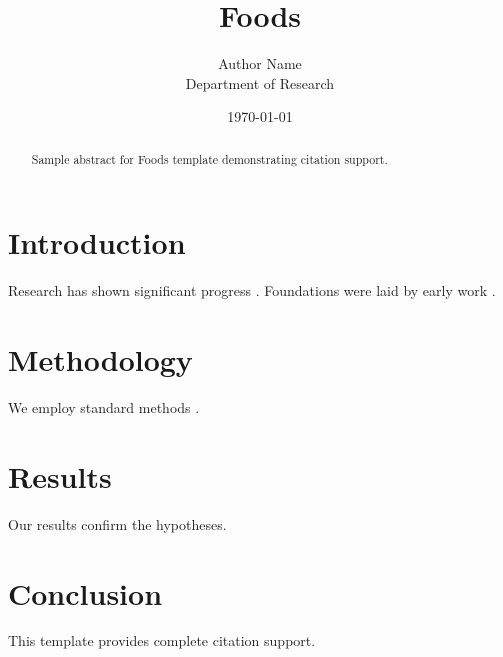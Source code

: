 \documentclass{mdpi}
\title{Foods}
\author{Author Name \\ \small Department of Research}
\date{\today}
\begin{document}
\maketitle

\begin{abstract}
Sample abstract for Foods template demonstrating citation support.
\end{abstract}

\section{Introduction}
Research has shown significant progress \citep{einstein1905}. Foundations were laid by early work \citep{turing1950}.

\section{Methodology}
We employ standard methods \citep{knuth1984}.

\section{Results}
Our results confirm the hypotheses.

\section{Conclusion}
This template provides complete citation support.



\end{document}
